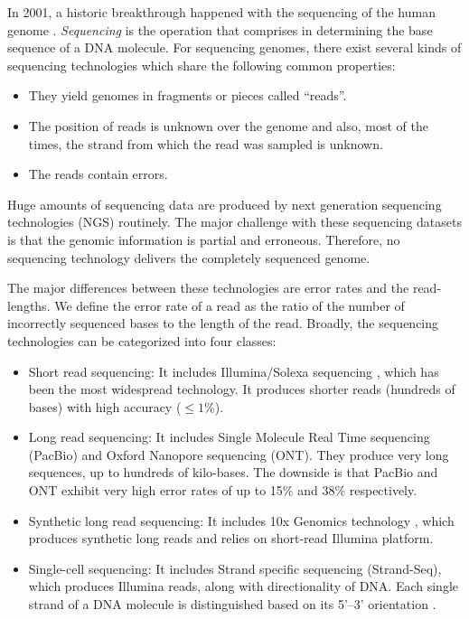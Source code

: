 In 2001, a historic breakthrough happened with the sequencing of the human genome \citep{collins2003human}.
\textit{Sequencing} is the operation that comprises in determining the base sequence of a DNA molecule.
For sequencing genomes, there exist several kinds of sequencing technologies which share the following common properties:
\begin{itemize}
 \item They yield genomes in fragments or pieces called ``reads''.
 \item The position of reads is unknown over the genome and also, most of the times, the strand from which the read was sampled is unknown.
 \item The reads contain errors.
\end{itemize}

Huge amounts of sequencing data are produced by next generation sequencing technologies (NGS) routinely. 
The major challenge with these sequencing datasets is that the genomic information is partial and erroneous. Therefore, no sequencing technology delivers the completely sequenced genome.

The major differences between these technologies are error rates and the read-lengths. We define the error rate of a read as the ratio of the number of incorrectly sequenced bases to the length of the read.
Broadly, the sequencing technologies can be categorized into four classes:
\begin{itemize}
 \item Short read sequencing: It includes Illumina/Solexa sequencing \citep{bentley2008accurate}, which has been the most widespread technology. 
 It produces shorter reads (hundreds of bases) with high accuracy ($\le 1$\%). 
  \item Long read sequencing: It includes Single Molecule Real Time sequencing (PacBio) \citep{eid2009real} and Oxford Nanopore sequencing (ONT)\citep{laszlo2014decoding}. They produce very long sequences, up to hundreds of kilo-bases. 
  The downside is that PacBio and ONT exhibit very high error rates of up to 15\% and 38\% respectively. 
  \item Synthetic long read sequencing: It includes 10x Genomics technology \citep{eisenstein2015startups}, which produces synthetic long reads and relies on short-read Illumina platform.
 \item Single-cell sequencing: It includes Strand specific sequencing (Strand-Seq), which produces Illumina reads, along with directionality of DNA. Each single strand of a DNA molecule is distinguished based on its 5'–3' orientation \citep{falconer2012dna}.
\end{itemize}

